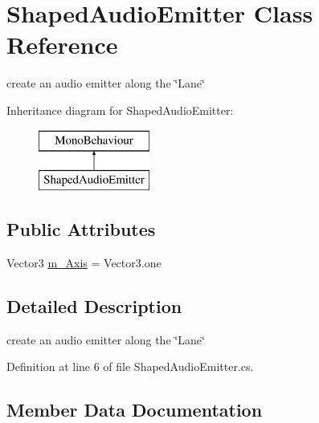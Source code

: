 \hypertarget{class_shaped_audio_emitter}{}\section{Shaped\+Audio\+Emitter Class Reference}
\label{class_shaped_audio_emitter}


create an audio emitter along the \char`\"{}\+Lane\char`\"{}  


Inheritance diagram for Shaped\+Audio\+Emitter\+:\begin{figure}[H]
\begin{center}
\leavevmode
\includegraphics[height=2.000000cm]{class_shaped_audio_emitter}
\end{center}
\end{figure}
\subsection*{Public Attributes}
\begin{DoxyCompactItemize}
\item 
Vector3 \mbox{\hyperlink{class_shaped_audio_emitter_a52156212ff278faa47d18775ee7572fa}{m\+\_\+\+Axis}} = Vector3.\+one
\end{DoxyCompactItemize}


\subsection{Detailed Description}
create an audio emitter along the \char`\"{}\+Lane\char`\"{} 



Definition at line 6 of file Shaped\+Audio\+Emitter.\+cs.



\subsection{Member Data Documentation}
\mbox{\label{class_shaped_audio_emitter_a52156212ff278faa47d18775ee7572fa}} 
